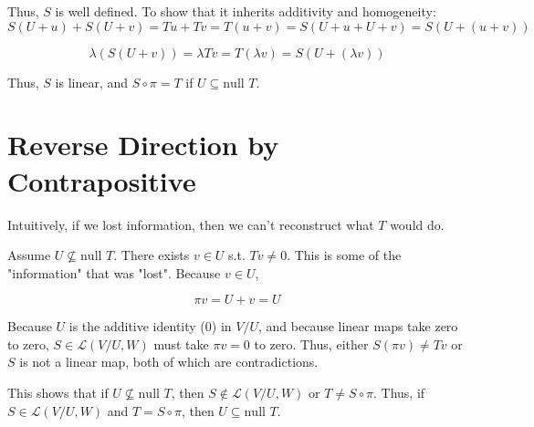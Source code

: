 \documentclass[letterpaper]{article}
\begin{document}
Thus, \(S\) is well defined. To show that it inherits additivity and homogeneity:
\[ S(U+u) + S(U+v) = Tu + Tv = T(u+v) = S(U+u + U+v) = S(U+(u+v)) \]

\[ \lambda\left(S(U+v)\right) = \lambda Tv = T(\lambda v) = S(U+(\lambda v)) \]

Thus, \(S\) is linear, and \(S \circ \pi = T\) if \(U \subseteq \text{null }T\).

\section{Reverse Direction by Contrapositive}
\label{sec:org0f76d02}
Intuitively, if we lost information, then we can't reconstruct what \(T\) would do.

Assume \(U \nsubseteq \text{null }T\). There exists \(v \in U\) s.t. \(Tv \neq 0\). This is some of the "information" that was "lost". Because \(v \in U\),

\[ \pi v = U + v = U \]

Because \(U\) is the additive identity (\(0\)) in \(V/U\), and because linear maps take zero to zero, \(S \in \mathcal L(V/U, W)\) must take \(\pi v = 0\) to zero.
Thus, either \(S(\pi v) \neq Tv\) or \(S\) is not a linear map, both of which are contradictions.

This shows that if \(U \nsubseteq \text{null }T\), then \(S \notin \mathcal L(V/U, W)\) or \(T \neq S \circ \pi\). Thus, if \(S \in \mathcal L(V/U, W)\) and \(T = S \circ \pi\), then \(U \subseteq \text{null }T\).
\end{document}
